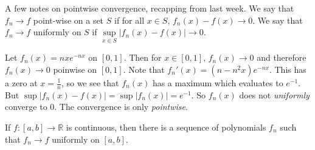 \documentclass[crop=false,class=article,oneside]{standalone}
\begin{document}
        A few notes on pointwise convergence, recapping
        from last week. We say that $f_{n}\rightarrow{f}$
        point-wise on a set $S$ if for all $x\in{S}$,
        $f_{n}(x)-f(x)\rightarrow{0}$. We say that
        $f_{n}\rightarrow{f}$ uniformly on $S$ if
        $\underset{x\in{S}}{\sup}%
         |f_{n}(x)-f(x)|\rightarrow{0}$.
        \begin{example}
            Let $f_{n}(x)=nxe^{-nx}$ on $[0,1]$.
            Then for $x\in[0,1]$, $f_{n}(x)\rightarrow{0}$
            and therefore $f_{n}(x)\rightarrow{0}$ poinwise
            on $[0,1]$. Note that
            $f_{n}'(x)=(n-n^{2}x)e^{-nx}$. This has a
            zero at $x=\frac{1}{n}$, so we see that
            $f_{n}(x)$ has a maximum
            which evaluates to $e^{-1}$. But
            $\sup|f_{n}(x)-f(x)|=\sup|f_{n}(x)|=e^{-1}$.
            So $f_{n}(x)$ does not
            \textit{uniformly} converge to $0$. The
            convergence is only \textit{pointwise}.
        \end{example}
        \begin{theorem}
            If $f:[a,b]\rightarrow\mathbb{R}$ is continuous,
            then there is a sequence of polynomials
            $f_{n}$ such that $f_{n}\rightarrow{f}$
            uniformly on $[a,b]$.
        \end{theorem}
\end{document}
